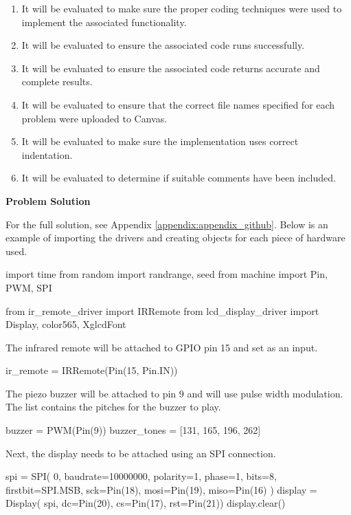 \begin{tcolorbox}[breakable, enhanced jigsaw, title=ME 400: Assignment \ref{comp_app_assignment_1}, 
    colframe=ksu-purple, colback=ksu-gray]
    \begin{enumerate}
        \item It will be evaluated to make sure the proper coding techniques were used to implement the
        associated functionality.
        \item It will be evaluated to ensure the associated code runs successfully.
        \item It will be evaluated to ensure the associated code returns accurate and complete results.
        \item It will be evaluated to ensure that the correct file names specified for each problem were
        uploaded to Canvas.
        \item It will be evaluated to make sure the implementation uses correct indentation.
        \item It will be evaluated to determine if suitable comments have been included.
    \end{enumerate}

    \tcblower
    \textbf{Problem Solution}
    \parindent15pt

    For the full solution, see Appendix \ref{appendix:appendix_github}. Below is an example of 
    importing the drivers and creating objects for each piece of hardware used.

\begin{python}
import time
from random import randrange, seed
from machine import Pin, PWM, SPI

from ir_remote_driver import IRRemote
from lcd_display_driver import Display, color565, XglcdFont
\end{python}

The infrared remote will be attached to GPIO pin 15 and set as an input.

\begin{python}
ir_remote = IRRemote(Pin(15, Pin.IN))
\end{python}

The piezo buzzer will be attached to pin 9 and will use pulse width modulation. The 
 list contains the pitches for the buzzer to play.

\begin{python}
buzzer = PWM(Pin(9))
buzzer_tones = [131, 165, 196, 262]
\end{python}

Next, the display needs to be attached using an SPI connection.

\begin{python}
spi = SPI(
    0, 
    baudrate=10000000, 
    polarity=1,
    phase=1,
    bits=8,
    firstbit=SPI.MSB,
    sck=Pin(18), 
    mosi=Pin(19),
    miso=Pin(16)
)
display = Display(
    spi, dc=Pin(20), cs=Pin(17), rst=Pin(21))
display.clear()
\end{python}


\end{tcolorbox}
